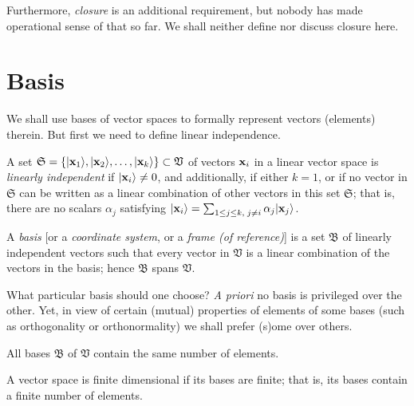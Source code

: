 Furthermore, {\em closure} is an additional requirement, but nobody has made operational sense of that so far.
We shall neither define nor discuss closure here.




\section{Basis}
\label{2012-m-ch-fdvs-Basis}

We shall use bases of vector spaces to formally represent vectors (elements) therein.
But first we need to define {linear independence}.

A set ${\mathfrak S}=\{
\vert {\bf x}_1\rangle ,
\vert {\bf x}_2\rangle ,
\ldots ,
\vert {\bf x}_k\rangle \} \subset {\mathfrak V}$
of vectors ${\bf x}_i$ in a linear vector space
is {\em linearly independent}
if $\vert {\bf x}_i\rangle \neq 0$,
and additionally, if either $k=1$,
or if no vector in $\mathfrak S$ can be written as a linear combination of other vectors in this set $\mathfrak S$;
that is, there are no scalars $\alpha_j$ satisfying
 $\vert {\bf x}_i\rangle =\sum_{1\le j \le k, \; j\neq i}\alpha_j \vert {\bf x}_j\rangle$.



A {\em basis}
[or a {\em coordinate system}, or a {\em frame (of reference)}]
is a set    $\mathfrak B$
of linearly independent vectors
such that every vector
in $\mathfrak V$ is a linear combination of the vectors in the basis; hence
$\mathfrak B$ spans $\mathfrak V$.

What particular basis should one choose?
{\it A priori} no basis is privileged over the other.
Yet, in view of certain (mutual) properties of elements of some bases (such as orthogonality or orthonormality)
we shall prefer (s)ome over others.



All bases $\mathfrak B$ of $\mathfrak V$ contain the same number of elements.

A vector space is finite dimensional if its bases are finite; that is, its bases
contain a finite number of elements.




